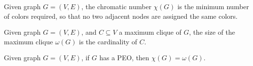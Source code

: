 
\begin{definition}
    Given graph $G = (V, E)$, the chromatic number $\chi(G)$ is the minimum number of colors required, so that no two adjacent nodes are assigned the same colors.
\end{definition}

\begin{theorem}
    Given graph $G = (V, E)$, and $C \subseteq V$ a maximum clique of $G$, the size of the maximum clique $\omega(G)$ is the cardinality of $C$.
\end{theorem}

\begin{theorem}
    Given graph $G = (V, E)$, if $G$ has a PEO, then $\chi(G) = \omega(G)$.
\end{theorem}
